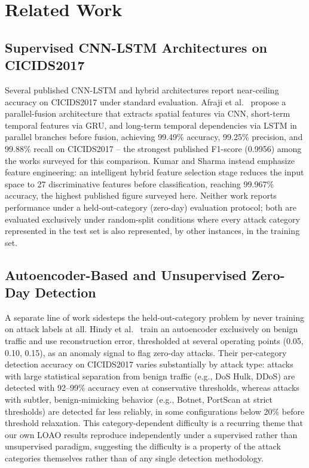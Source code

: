 \documentclass[11pt]{article}
\begin{document}
\section{Related Work}
\label{sec:related}

\subsection{Supervised CNN-LSTM Architectures on CICIDS2017}

Several published CNN-LSTM and hybrid architectures report near-ceiling accuracy on CICIDS2017
under standard evaluation. Afraji et al.\ \cite{afraji2025} propose a parallel-fusion architecture
that extracts spatial features via CNN, short-term temporal features via GRU, and long-term
temporal dependencies via LSTM in parallel branches before fusion, achieving 99.49\% accuracy,
99.25\% precision, and 99.88\% recall on CICIDS2017 -- the strongest published F1-score
(0.9956) among the works surveyed for this comparison. Kumar and Sharma \cite{kumar2023} instead
emphasize feature engineering: an intelligent hybrid feature selection stage reduces the input
space to 27 discriminative features before classification, reaching 99.967\% accuracy, the highest
published figure surveyed here. Neither work reports performance under a held-out-category
(zero-day) evaluation protocol; both are evaluated exclusively under random-split conditions where
every attack category represented in the test set is also represented, by other instances, in the
training set.

\subsection{Autoencoder-Based and Unsupervised Zero-Day Detection}

A separate line of work sidesteps the held-out-category problem by never training on attack labels
at all. Hindy et al.\ \cite{hindy2020} train an autoencoder exclusively on benign traffic and use
reconstruction error, thresholded at several operating points (0.05, 0.10, 0.15), as an anomaly
signal to flag zero-day attacks. Their per-category detection accuracy on CICIDS2017 varies
substantially by attack type: attacks with large statistical separation from benign traffic (e.g.,
DoS Hulk, DDoS) are detected with 92--99\% accuracy even at conservative thresholds, whereas attacks
with subtler, benign-mimicking behavior (e.g., Botnet, PortScan at strict thresholds) are detected
far less reliably, in some configurations below 20\% before threshold relaxation. This
category-dependent difficulty is a recurring theme that our own LOAO results reproduce
independently under a supervised rather than unsupervised paradigm, suggesting the difficulty is a
property of the attack categories themselves rather than of any single detection methodology.
\end{document}
